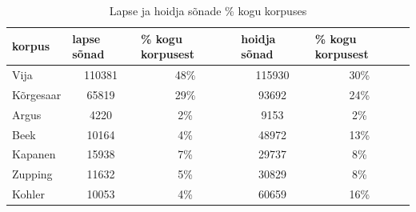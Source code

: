 \documentclass[12pt]{article}
\begin{document}
\begin{table}[H]
\centering
\caption{Lapse ja hoidja sõnade \% kogu korpuses}
\begin{tabular}{|l|c|c|c|c|}
\hline
korpus                 & \multicolumn{1}{l|}{lapse sõnad}                                       & \multicolumn{1}{l|}{\% kogu korpusest} & \multicolumn{1}{l|}{hoidja sõnad}                                      & \multicolumn{1}{l|}{\% kogu korpusest} \\ \hline\hline
Vija                   & 110381                                                                 & 48\%                                   & 115930                                                                 & 30\%                                   \\ \hline
Kõrgesaar              & 65819                                                                  & 29\%                                   & 93692                                                                  & 24\%                                   \\ \hline
Argus                  & 4220                                                                   & 2\%                                    & 9153                                                                   & 2\%                                    \\ \hline
Beek                   & 10164                                                                  & 4\%                                    & 48972                                                                  & 13\%                                   \\ \hline
Kapanen                & 15938                                                                  & 7\%                                    & 29737                                                                  & 8\%                                    \\ \hline
Zupping                & 11632                                                                  & 5\%                                    & 30829                                                                  & 8\%                                    \\ \hline
Kohler                 & 10053                                                                  & 4\%                                    & 60659                                                                  & 16\%                                   \\ \hline\hline

\end{tabular}
\end{table}
\end{document}

